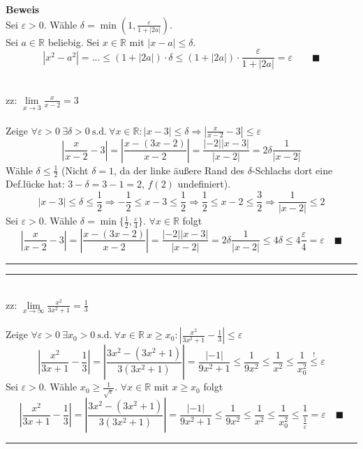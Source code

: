 \documentclass{article}
\newcommand{\lr}[1]{\left(#1\right)}
\begin{document}
\begin{itemize}
\begin{minipage}{\textwidth}
{	\textbf{Beweis}\\
	Sei $\varepsilon > 0$. Wähle $\delta = \min\lr{1, \frac{\varepsilon}{1 + |2a|}}$.\\
	Sei $a\in \mathbb{R}$ beliebig. Sei $x\in\mathbb{R}$ mit $|x - a| \leq \delta$.
		$$|x^2 - a^2| =... \leq (1 + |2a|) \cdot \delta \leq (1 + |2a|) \cdot \frac{\varepsilon}{1 + |2a|} = \varepsilon \qquad\blacksquare$$


	\\
	zz: $\lim\limits_{x\rightarrow 3} \frac{x}{x - 2} = 3$\\
	\\
	Zeige $\forall\varepsilon > 0\ \exists\delta > 0\ \text{s.d.}\ \forall x\in\mathbb{R}: |x - 3|\leq \delta \Rightarrow |\frac{x}{x - 2} - 3|\leq\varepsilon$
		$$\left|\frac{x}{x - 2} - 3\right| = \left|\frac{x - (3x - 2)}{x - 2}\right| = \frac{|-2||x - 3|}{|x - 2|} = 2\delta \frac{1}{|x - 2|}$$
	Wähle $\delta \leq \frac{1}{2}$ \textcolor{gruen}{(Nicht $\delta = 1$, da der linke äußere Rand des $\delta$-Schlachs dort eine Def.lücke hat: $3-\delta = 3-1 = 2$, $f(2)$  undefiniert)}.
		$$|x -3| \leq\delta \leq \frac{1}{2} \Rightarrow -\frac{1}{2} \leq x - 3 \leq \frac{1}{2} \Rightarrow \frac{1}{2} \leq x - 2 \leq \frac{3}{2} \Rightarrow \frac{1}{|x - 2|} \leq 2$$
	Sei $\varepsilon > 0$. Wähle $\delta = \min\{\frac{1}{2}, \frac{\varepsilon}{4}\}$. $\forall x\in\mathbb{R}$ folgt
		$$\left|\frac{x}{x - 2} - 3\right| = \left|\frac{x - (3x - 2)}{x - 2}\right| = \frac{|-2||x - 3|}{|x - 2|} = 2\delta \frac{1}{|x - 2|} \leq 4\delta \leq 4\frac{\varepsilon}{4} = \varepsilon \quad\blacksquare$$
\hrule 
}
\end{minipage}

\vspace{0.5cm}

\begin{minipage}{\textwidth}
	{\color{blue}
	\hrule
		\\
	zz: $\lim\limits_{x\rightarrow\infty} \frac{x^2}{3x^2 + 1} = \frac{1}{3}$\\
	\\
	Zeige $\forall\varepsilon > 0\ \exists x_0 > 0\ \text{s.d.}\ \forall x\in\mathbb{R}\ x\geq x_0: |\frac{x^2}{3x^2 + 1} - \frac{1}{3}| \leq \varepsilon$
		$$\left|\frac{x^2}{3x + 1} - \frac{1}{3} \right| = \left|\frac{3x^2 - (3x^2 + 1)}{3(3x^2 + 1)}\right| = \frac{|-1|}{9x^2 + 1} \leq \frac{1}{9x^2} \leq \frac{1}{x^2} \leq \frac{1}{x_0^2} \stackrel{!}{\leq} \varepsilon$$
	Sei $\varepsilon > 0$. Wähle $x_0 \geq \frac{1}{\sqrt{\varepsilon}}$. $\forall x\in\mathbb{R}$ mit $x \geq x_0$ folgt
		$$\left|\frac{x^2}{3x + 1} - \frac{1}{3} \right| = \left|\frac{3x^2 - (3x^2 + 1)}{3(3x^2 + 1)}\right| = \frac{|-1|}{9x^2 + 1} \leq \frac{1}{9x^2} \leq \frac{1}{x^2} \leq \frac{1}{x_0^2} \leq \frac{1}{\frac{1}{\varepsilon}} = \varepsilon \quad\blacksquare$$
	\hrule
	}
\end{minipage}



\end{itemize}
\end{document}
